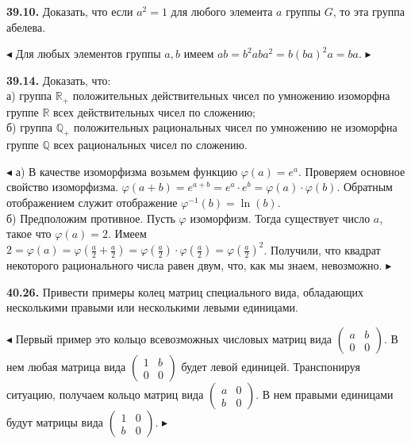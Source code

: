 \documentclass[a5paper,10pt]{article}
\begin{document}
\bigskip
\noindent
{\bf 39.10.} Доказать, что если $a^2=1$ для любого элемента $a$ группы $G$, то эта группа абелева.

\medskip
\noindent
$\blacktriangleleft$ Для любых элементов группы $a,b$ имеем $ab=b^2aba^2=b(ba)^2a=ba$.
$\blacktriangleright$

\bigskip
\noindent
{\bf 39.14.} Доказать, что:\\
а) группа $\mathbb R_+$ положительных действительных чисел по умножению изоморфна группе $\mathbb R$ всех действительных чисел по сложению;\\
б) группа $\mathbb Q_+$ положительных рациональных чисел по умножению не изоморфна группе $\mathbb Q$ всех рациональных чисел по сложению.

\medskip
\noindent
$\blacktriangleleft$
а) В качестве изоморфизма возьмем функцию $\varphi(a)=e^a$. Проверяем основное свойство изоморфизма. $\varphi(a+b)=e^{a+b}=e^a\cdot e^b=\varphi(a)\cdot\varphi(b)$. Обратным отображением служит отображение $\varphi^{-1}(b)=\ln(b)$.\\
б) Предположим противное. Пусть $\varphi$ изоморфизм. Тогда существует число $a$, такое что $\varphi(a)=2$. Имеем
$\displaystyle 2=\varphi(a)=\varphi\left(\frac a2+\frac a2\right)=\varphi\left(\frac a2\right)\cdot\varphi\left(\frac a2\right)=\varphi\left(\frac a2\right)^2$. Получили, что квадрат некоторого рационального числа равен двум, что, как мы знаем, невозможно.
$\blacktriangleright$

\bigskip
\noindent
{\bf 40.26.} Привести примеры колец матриц специального вида, обладающих не\-сколькими правыми или несколькими левыми единицами.

\medskip
\noindent
$\blacktriangleleft$ Первый пример это кольцо всевозможных числовых матриц вида $\begin{pmatrix}a&b\\0&0\end{pmatrix}$. В нем любая матрица вида $\begin{pmatrix}1&b\\0&0\end{pmatrix}$ будет левой единицей. Транспонируя ситуацию, получаем кольцо матриц вида $\begin{pmatrix}a&0\\b&0\end{pmatrix}$. В нем правыми единицами будут матрицы вида $\begin{pmatrix}1&0\\b&0\end{pmatrix}$. $\blacktriangleright$
\end{document}
